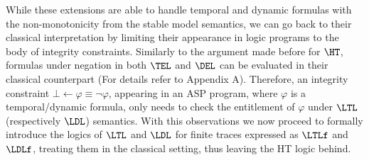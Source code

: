 While these extensions are able to handle temporal and dynamic formulas with the non-monotonicity from the stable model semantics, we can go back to their classical interpretation by limiting their appearance in logic programs to the body of integrity constraints. 
Similarly to the argument made before for $\HT$, formulas under negation in both $\TEL$ and $\DEL$ can be evaluated in their classical counterpart (For details refer to Appendix A).
Therefore, an integrity constraint $\bot \leftarrow \varphi \equiv \neg \varphi$, appearing in an ASP program, where $\varphi$ is a temporal/dynamic formula, only needs to check the entitlement of $\varphi$ under $\LTL$ (respectively $\LDL$) semantics. 
With this observations we now proceed to formally introduce the logics of $\LTL$ and $\LDL$ for finite traces expressed as $\LTLf$ and $\LDLf$, treating them in the classical setting, thus leaving the HT logic behind. 
